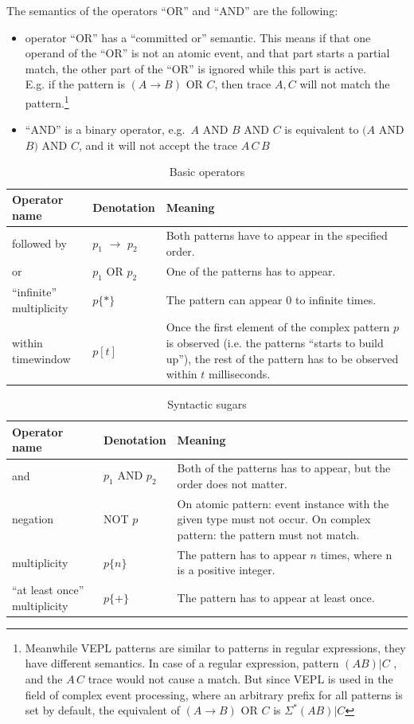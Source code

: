 The semantics of the operators ``OR'' and ``AND'' are the following:
\begin{itemize}
	\item operator ``OR'' has a ``committed or'' semantic. This means if that one operand of the ``OR'' is not an atomic event, and that part starts a partial match, the other part of the ``OR'' is ignored while this part is active. \\
	E.g. if the pattern is $(A \rightarrow B)$ OR $C$,
	then trace $A,C$ will not match the pattern.\footnote{Meanwhile VEPL patterns are similar to patterns in regular expressions, they have different semantics. In case of a regular expression, pattern $(AB)|C$ , and the $A\,C$ trace would not cause a match. But since VEPL is used in the field of complex event processing, where an arbitrary prefix for all patterns is set by default, the equivalent of $(A \rightarrow B)$ OR $C$ is $\Sigma^\ast (AB)|C$}
	\item ``AND'' is a binary operator, e.g.~$A$ AND $B$ AND $C$ is equivalent to $(A$ AND $B)$ AND $C$,
	and it will not accept the trace $A\,C\,B$
\end{itemize}

\begin{table}
	\caption{Basic operators}		
	\label{tab:cep:veplop}
	\begin{tabularx}{\textwidth}{llX}
		\toprule
		Operator name &	Denotation & Meaning \\
		\midrule
		followed by & $p_1$ $\rightarrow$ $p_2$ & Both patterns have to appear in the specified order. \\
		or & $p_1$ OR $p_2$ &	One of the patterns has to appear. \\
		``infinite'' multiplicity & $p\{{\ast}\}$ & The pattern can appear 0 to infinite times. \\
		within timewindow &	$p[t]$ & Once the first element of the complex pattern $p$ is observed (i.e. the patterns ``starts to build up''), the rest of the pattern has to be observed within $t$ milliseconds. \\
		\bottomrule
	\end{tabularx}
\end{table}

\begin{table}
	\caption{Syntactic sugars}		
	\label{tab:cep:veplsugar}
	\begin{tabularx}{\textwidth}{llX}
		\toprule
		Operator name &	Denotation & Meaning \\
		\midrule
		and & $p_1$ AND $p_2$ & Both of the patterns has to appear, but the order does not matter.\\
		negation & NOT $p$ & On atomic pattern: event instance with the given type must not occur. On complex pattern: the pattern must not match. \\
		multiplicity & $p\{n\}$ & The pattern has to appear $n$ times, where n is a positive integer.\\
		``at least once'' multiplicity & $p\{+\}$ & The pattern has to appear at least once. \\
		\bottomrule
	\end{tabularx}
\end{table}


